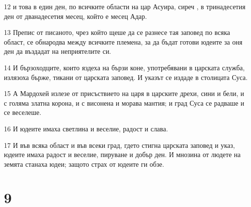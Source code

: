 \par 12 и това в един ден, по всичките области на цар Асуира, сиреч , в тринадесетия ден от дванадесетия месец, който е месец Адар.
\par 13 Препис от писаното, чрез който щеше да се разнесе тая заповед по всяка област, се обнародва между всичките племена, за да бъдат готови юдеите за оня ден да въздадат на неприятелите си.
\par 14 И бързоходците, които яздеха на бързи коне, употребявани в царската служба, излязоха бърже, тикани от царската заповед. И указът се издаде в столицата Суса.
\par 15 А Мардохей излезе от присъствието на царя в царските дрехи, сини и бели, и с голяма златна корона, и с висонена и морава мантия; и град Суса се радваше и се веселеше.
\par 16 И юдеите имаха светлина и веселие, радост и слава.
\par 17 И във всяка област и във всеки град, гдето стигна царската заповед и указ, юдеите имаха радост и веселие, пируване и добър ден. И мнозина от людете на земята станаха юдеи; защото страх от юдеите ги обзе.

\chapter{9}

